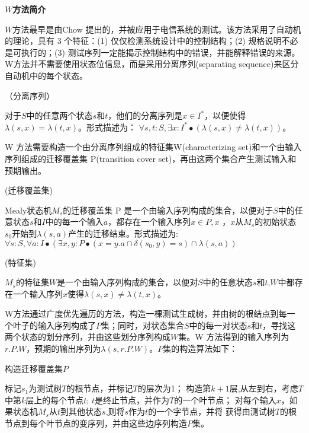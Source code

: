 \textbf{$W$方法简介}

$W$方法最早是由Chow\cite{Chow1978}
提出的，并被应用于电信系统的测试。该方法采用了自动机的理论，具有 3 个特征：(1)  仅仅检测系统设计中的控制结构；(2)  规格说明不必是可执行的；(3)  测试序列一定能揭示控制结构中的错误，并能解释错误的来源。
W方法并不需要使用状态位信息，而是采用分离序列(separating sequence)来区分
自动机中的每个状态。

\begin{definition}{（分离序列）}

对于$S$中的任意两个状态$s$和$t$，他们的分离序列是$x\in I^{*}$，以便使得$\lambda(s,x)=\lambda(t,x)$。形式描述为：
$\forall s,t:S,\exists x:I^{*}\bullet (\lambda(s,x)\neq \lambda(t,x))$。
\end{definition}

W 方法需要构造一个由分离序列组成的特征集W(characterizing set)和一个由输入序列组成的迁移覆盖集 P(transition cover set)，再由这两个集合产生测试输入和预期输出。

\begin{definition}{(迁移覆盖集)}

Mealy状态机$M_s$的迁移覆盖集 P 是一个由输入序列构成的集合，以便对于$S$中的任意状态$s$和$I$中的每一个输入$a$，都存在一个输入序列$x\in P,x$ ，$x$从$M_s$的初始状态$s_0$开始到$\lambda(s,a)$产生的迁移结束。形式描述为:
$\forall s:S,\forall a:I\bullet (\exists x,y:P\bullet (x=y.a\cap \delta(s_0,y)=s)\cap \lambda(s,a))$
\end{definition}

\begin{definition}{(特征集)}

$M_s$的特征集$W$是一个由输入序列构成的集合，以便对$S$中的任意状态$s$和$t$,$W$中都存在一个输入序列$x$使得$\lambda(s,x)\neq \lambda(t,x)$。

\end{definition}

W方法通过广度优先遍历的方法，构造一棵测试生成树，并由树的根结点到每一个叶子的输入序列构成了$P$集；同时，对状态集合$ S $中的每一对状态$ s $和$ t$，寻找这两个状态的划分序列，并由这些划分序列构成$ W $集。W 方法得到的输入序列为
$r.P.W$，预期的输出序列为$\lambda(s,  r.P.W)$。$P$集的构造算法如下：

    \begin{algorithm}[htbp]
        \caption{构造迁移覆盖集$P$}
        \label{algo-pset}
        \begin{algorithmic} [1]%
 			\STATE 标记$s_1$为测试树$T$的根节点，并标记$T$的层次为1；
 			\STATE 构造第$k+1$层,从左到右，考虑$T$中第$k$层上的每个节点$t$;
 				\STATE $t$是终止节点，并作为$T$的一个叶节点；
 				\ELSE
 				\STATE 对每个输入$x$，如果状态机$M_s$从$t$到其他状态$s$,则将$s$作为$t$的一个字节点，并将
 				\ENDIF
 			\STATE 获得由测试树$T$的根节点到每个叶节点的变序列，并由这些边序列构造$P$集。
 			\ENDIF
        \end{algorithmic}
    \end{algorithm}


